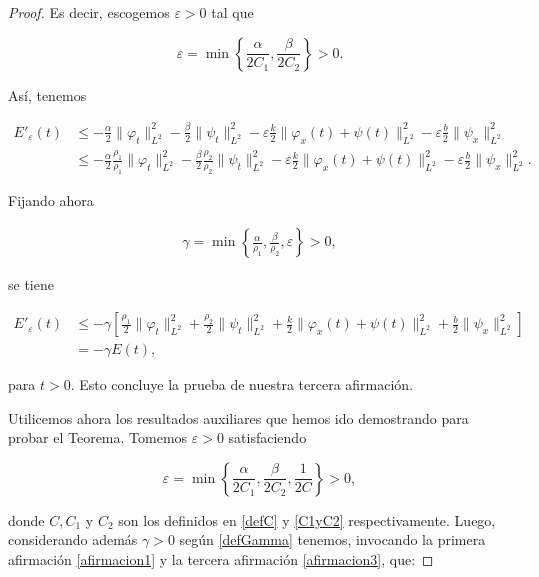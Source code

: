 \begin{proof}
    Es decir, escogemos $\varepsilon > 0$ tal que

    \[\varepsilon = \min \left \{\frac{\alpha}{2C_1} ,\frac{\beta}{2C_2}\right \} > 0.\]

    Así, tenemos

    \begin{align*}
        E'_\varepsilon(t) &\leq -\frac{\alpha}{2}\lVert \varphi_t \rVert^2_{L^2} - \frac{\beta}{2}\lVert \psi_t \rVert^2_{L^2} - \varepsilon \frac{k}{2} \lVert \varphi_x(t) + \psi(t) \rVert^2_{L^2} - \varepsilon \frac{b}{2} \lVert \psi_x \rVert^2_{L^2}\\
        &\leq -\frac{\alpha}{2}\frac{\rho_1}{\rho_1}\lVert \varphi_t \rVert^2_{L^2} - \frac{\beta}{2}\frac{\rho_2}{\rho_2}\lVert \psi_t \rVert^2_{L^2} - \varepsilon \frac{k}{2} \lVert \varphi_x(t) + \psi(t) \rVert^2_{L^2} - \varepsilon \frac{b}{2} \lVert \psi_x \rVert^2_{L^2}.
    \end{align*}

    Fijando ahora

    \begin{align}
        \label{defGamma}
        \gamma = \min \left\{\frac{\alpha}{\rho_1}, \frac{\beta}{\rho_2}, \varepsilon \right\} > 0,
    \end{align}

    se tiene

    \begin{align*}
        E'_\varepsilon(t) &\leq -\gamma \left[\frac{\rho_1}{2}\lVert \varphi_t \rVert^2_{L^2} + \frac{\rho_2}{2}\lVert \psi_t \rVert^2_{L^2} + \frac{k}{2} \lVert \varphi_x(t) + \psi(t) \rVert^2_{L^2} + \frac{b}{2} \lVert \psi_x \rVert^2_{L^2}\right]\\
        &= -\gamma E(t),
    \end{align*}

    para $t > 0$. Esto concluye la prueba de nuestra tercera afirmación.

    Utilicemos ahora los resultados auxiliares que hemos ido demostrando para probar el Teorema. Tomemos $\varepsilon > 0$ satisfaciendo

    \[\varepsilon = \min\left\{\frac{\alpha}{2C_1}, \frac{\beta}{2C_2}, \frac{1}{2C} \right\} > 0,\]

    donde $C, C_1$ y $C_2$ son los definidos en \eqref{defC} y \eqref{C1yC2} respectivamente. Luego, considerando además $\gamma > 0$ según \eqref{defGamma} tenemos, invocando la primera afirmación \eqref{afirmacion1} y la tercera afirmación \eqref{afirmacion3}, que:


\end{proof}
